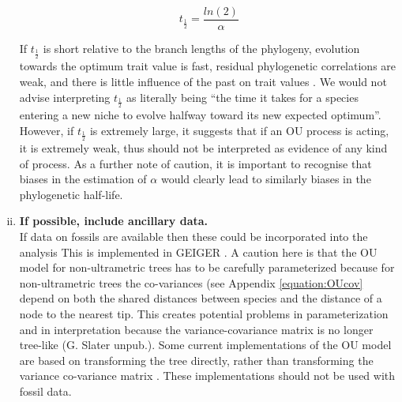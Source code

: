 \documentclass[a4paper,12pt]{article}
\begin{document}
\begin{enumerate}[(i)]
      \begin{equation}
        t_\frac{1}{2} = \frac{ln(2)}{\alpha}
        \label{equation:halflife}
      \end{equation}
    
    \noindent
    If $t_\frac{1}{2}$ is short relative to the branch lengths of the phylogeny, evolution towards the optimum trait value is fast, residual phylogenetic correlations are weak, and there is little influence of the past on trait values \citep{hansen1997stabilizing}.
    We would not advise interpreting $t_\frac{1}{2}$ as literally being ``the time it takes for a species entering a new niche to evolve halfway toward its new expected optimum''.
    However, if $t_\frac{1}{2}$ is extremely large, it suggests that if an OU process is acting, it is extremely weak, thus should not be interpreted as evidence of any kind of process. 
    As a further note of caution, it is important to recognise that biases in the estimation of $\alpha$ would clearly lead to similarly biases in the phylogenetic half-life.
  
    
    \item \textbf{If possible, include ancillary data.}\\
    If data on fossils are available then these could be incorporated into the analysis \citep{Slater:2012ab}
    This is implemented in GEIGER \citep{Harmon:2008aa}.
    A caution here is that the OU model for non-ultrametric trees has to be carefully parameterized because for non-ultrametric trees the co-variances (see Appendix \ref{equation:OUcov} depend on both the shared distances between species and the distance of a node to the nearest tip. 
    This creates potential problems in parameterization and in interpretation because the variance-covariance matrix is no longer tree-like (G. Slater unpub.). 
    Some current implementations of the OU model are based on transforming the tree directly, rather than transforming the variance co-variance matrix \citep[e.g., MOTMOT;][]{Thomas:2011aa}. 
    These implementations should not be used with fossil data.
   \end{enumerate}  
    
\end{document}

